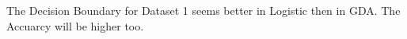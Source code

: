 \begin{answer}
    The Decision Boundary for Dataset 1 seems better in Logistic then in GDA. The Accuarcy will be higher too.
\end{answer}
